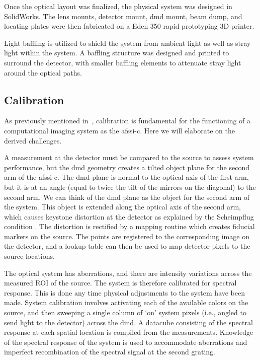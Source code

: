 Once the optical layout was finalized, the physical system was designed in SolidWorks. The lens mounts, detector mount, \gls{dmd} mount, beam dump, and locating plates were then fabricated on a Eden 350 rapid prototyping 3D printer.

Light baffling is utilized to shield the system from ambient light as well as stray light within the system. A baffling structure was designed and printed to surround the detector, with smaller baffling elements to attenuate stray light around the optical paths.


\subsection{Calibration}


As previously mentioned in~\cite{Dunlop:COSI2013}, calibration is fundamental for the functioning of a computational imaging system as the \gls{afssi-c}. Here we will elaborate on the derived challenges.

A measurement at the detector must be compared to the source to assess system performance, but the \gls{dmd} geometry creates a tilted object plane for the second arm of the \gls{afssi-c}. The \gls{dmd} plane is normal to the optical axis of the first arm, but it is at an angle (equal to twice the tilt of the mirrors on the diagonal) to the second arm. We can think of the \gls{dmd} plane as the object for the second arm of the system. This object is extended along the optical axis of the second arm, which causes keystone distortion at the detector as explained by the Scheimpflug condition \cite{ModernOpticalEngineering}. The distortion is rectified by a mapping routine which creates fiducial markers on the source. The points are registered to the corresponding image on the detector, and a lookup table can then be used to map detector pixels to the source locations.

The optical system has aberrations, and there are intensity variations across the measured ROI of the source. The system is therefore calibrated for spectral response. This is done any time physical adjustments to the system have been made. System calibration involves activating each of the available colors on the source, and then sweeping a single column of `on' system pixels (i.e., angled to send light to the detector) across the \gls{dmd}. A datacube consisting of the spectral response at each spatial location is compiled from the measurements. Knowledge of the spectral response of the system is used to accommodate aberrations and imperfect recombination of the spectral signal at the second grating.

